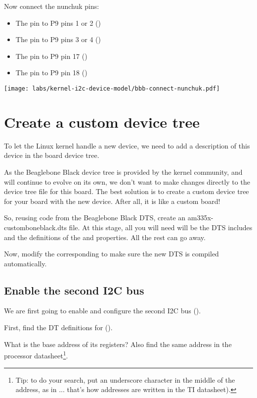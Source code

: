 Now connect the nunchuk pins:
\begin{itemize}
\item The  pin to P9 pins 1 or 2 ()
\item The  pin to P9 pins 3 or 4 ()
\item The  pin to P9 pin 17 ()
\item The  pin to P9 pin 18 ()
\end{itemize}

\begin{center}
\texttt{[image: labs/kernel-i2c-device-model/bbb-connect-nunchuk.pdf]}
\end{center}

\section{Create a custom device tree}

To let the Linux kernel handle a new device, we need to add a
description of this device in the board device tree.

As the Beaglebone Black device tree is provided by the kernel community,
and will continue to evolve on its own, we don't want to make changes
directly to the device tree file for this board. The best solution is
to create a custom device tree for your board with the new device.
After all, it is like a custom board!

So, reusing code from the Beaglebone Black DTS, create an
am335x-customboneblack.dts file. At this stage, all you will need
will be the DTS includes and the definitions of the 
and  properties. All the rest can go away.

Now, modify the corresponding  to make sure the
new DTS is compiled automatically.

\subsection{Enable the second I2C bus}

We are first going to enable and configure the second I2C bus
().

First, find the DT definitions for ().

What is the base address of its registers? Also find the same address in
the processor datasheet\footnote{Tip: to do your search, put an
underscore character in the middle of the address, as in
... that's how addresses are written in the
TI datasheet).}.


